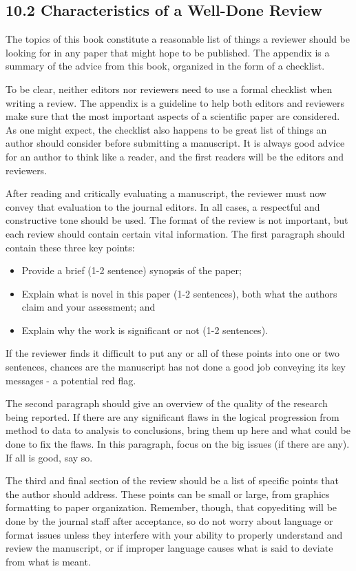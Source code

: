 \subsection*{10.2 Characteristics of a Well-Done Review}
The topics of this book constitute a reasonable list of things a reviewer should be looking for in any paper that might hope to be published. The appendix is a summary of the advice from this book, organized in the form of a checklist.

To be clear, neither editors nor reviewers need to use a formal checklist when writing a review. The appendix is a guideline to help both editors and reviewers make sure that the most important aspects of a scientific paper are considered. As one might expect, the checklist also happens to be great list of things an author should consider before submitting a manuscript. It is always good advice for an author to think like a reader, and the first readers will be the editors and reviewers.

After reading and critically evaluating a manuscript, the reviewer must now convey that evaluation to the journal editors. In all cases, a respectful and constructive tone should be used. The format of the review is not important, but each review should contain certain vital information. The first paragraph should contain these three key points:

\begin{itemize}
  \item Provide a brief (1-2 sentence) synopsis of the paper;
  \item Explain what is novel in this paper (1-2 sentences), both what the authors claim and your assessment; and
  \item Explain why the work is significant or not (1-2 sentences).
\end{itemize}

If the reviewer finds it difficult to put any or all of these points into one or two sentences, chances are the manuscript has not done a good job conveying its key messages - a potential red flag.

The second paragraph should give an overview of the quality of the research being reported. If there are any significant flaws in the logical progression from method to data to analysis to conclusions, bring them up here and what could be done to fix the flaws. In this paragraph, focus on the big issues (if there are any). If all is good, say so.

The third and final section of the review should be a list of specific points that the author should address. These points can be small or large, from graphics formatting to paper organization. Remember, though, that copyediting will be done by the journal staff after acceptance, so do not worry about language or format issues unless they interfere with your ability to properly understand and review the manuscript, or if improper language causes what is said to deviate from what is meant.

